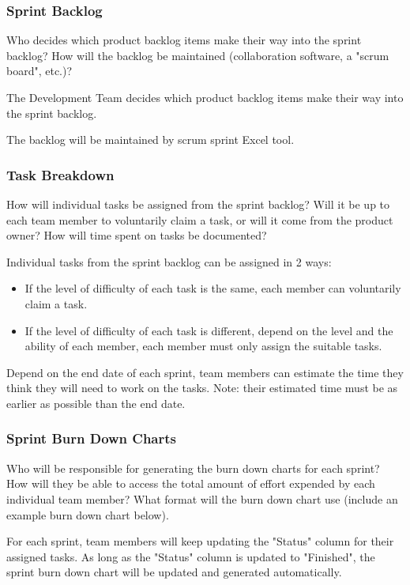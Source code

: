 \subsubsection{Sprint Backlog}
Who decides which product backlog items make their way into the sprint backlog? How will the backlog be maintained (collaboration software, a "scrum board", etc.)?

The Development Team decides which product backlog items make their way into the sprint backlog.

The backlog will be maintained by scrum sprint Excel tool.

\subsubsection{Task Breakdown}
How will individual tasks be assigned from the sprint backlog? Will it be up to each team member to voluntarily claim a task, or will it come from the product owner? How will time spent on tasks be documented?

Individual tasks from the sprint backlog can be assigned in 2 ways: 
\begin{itemize}

\item If the level of difficulty of each task is the same, each member can voluntarily claim a task.

\item If the level of difficulty of each task is different, depend on the level and the ability of each member, each member must only assign the suitable tasks.  

\end{itemize}

Depend on the end date of each sprint, team members can estimate the time they think they will need to work on the tasks. Note: their estimated time must be as earlier as possible than the end date. 

\subsubsection{Sprint Burn Down Charts}
Who will be responsible for generating the burn down charts for each sprint? How will they be able to access the total amount of effort expended by each individual team member? What format will the burn down chart use (include an example burn down chart below).

For each sprint, team members will keep updating the "Status" column for their assigned tasks. As long as the "Status" column is updated to "Finished", the sprint burn down chart will be updated and generated automatically. 

